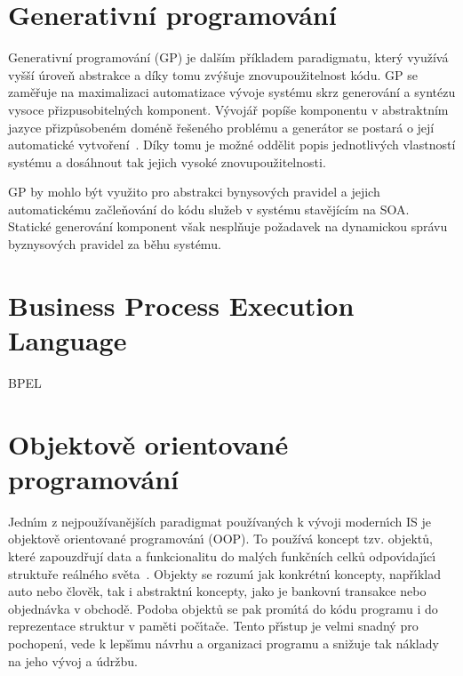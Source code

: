 \section{Generativní programování}

Generativní programování (\gls{GP}) je dalším příkladem paradigmatu, který
využívá vyšší úroveň abstrakce a díky tomu zvýšuje znovupoužitelnost
kódu. \gls{GP} se zaměřuje na maximalizaci automatizace vývoje systému
skrz generování a syntézu vysoce přizpusobitelných komponent. Vývojář
popíše komponentu v abstraktním jazyce přizpůsobeném doméně řešeného
problému a generátor se postará o její automatické vytvoření~\cite{czarnecki2000generative}.
Díky tomu je možné oddělit popis jednotlivých vlastností systému a dosáhnout tak
jejich vysoké znovupoužitelnosti.

\gls{GP} by mohlo být využito pro abstrakci bynysových pravidel a jejich automatickému
začleňování do kódu služeb v systému stavějícím na \gls{SOA}.
Statické generování komponent však nesplňuje požadavek na dynamickou správu
byznysových pravidel za běhu systému.

\section{Business Process Execution Language}

\gls{BPEL}


\section{Objektově orientované programování}\label{sec:oop}

Jedn\'{\i}m z nejpoužívanějších paradigmat používaných k
v\'yvoji modern\'{\i}ch \gls{IS} je objektově orientované programován\'{\i} (\gls{OOP}).
To používá koncept tzv. objektů, které zapouzdřují data a funkcionalitu do
malých funkčních celků odpov\'{\i}daj\'{\i}c\'{\i} struktuře reálného světa~\cite{rentsch1982object}.
Objekty se rozum\'{\i} jak konkrétn\'{\i} koncepty, např\'{\i}klad auto nebo člověk, tak i
abstraktn\'{\i} koncepty, jako je bankovn\'{\i} transakce nebo objednávka v obchodě.
Podoba objektů se pak prom\'{\i}tá do kódu programu i do reprezentace struktur v paměti
poč\'{\i}tače. Tento př\'{\i}stup je velmi snadn\'y pro pochopen\'{\i},
vede k lepš\'{\i}mu návrhu a organizaci programu a snižuje
tak náklady na jeho v\'yvoj a údržbu.

